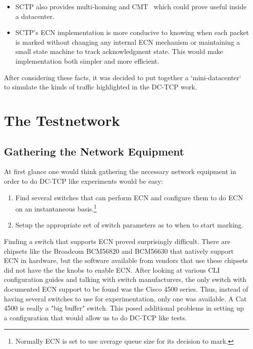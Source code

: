 \documentclass[12pt]{article}
\begin{document}
\begin{enumerate}
\begin{itemize}
\item SCTP also provides multi-homing and CMT~\cite{jana} which could prove useful inside a datacenter.

\item SCTP's ECN implementation is more conducive to knowing when each packet is marked without
      changing any internal ECN mechanism or maintaining a small state machine to track acknowledgment state. 
      This would make implementation both simpler and more efficient.
\end{itemize}

\end{enumerate}

After considering these facts, it was decided to put together a `mini-datacenter`
to simulate the kinds of traffic highlighted in the DC-TCP work.

\section{The Testnetwork}
\subsection{Gathering the Network Equipment}

At first glance one would think gathering the necessary network equipment in order to do DC-TCP like
experiments would be easy:
\begin{enumerate}
\item Find several switches that can perform ECN and configure them
to do ECN on an instantaneous basis.\footnote{Normally ECN is set to use average queue size
for its decision to mark.}

\item Setup the appropriate set of switch parameters as to when to start
marking. 

\end{enumerate}

Finding a switch that supports ECN proved surprisingly difficult.  
There are chipsets like the Broadcom BCM56820 and BCM56630 that natively support 
ECN in hardware,  but the software available from vendors that use
these chipsets did not have the the knobs to enable ECN. After looking at various CLI
configuration guides and talking with switch manufacturers, the only switch with documented
ECN support to be found was the Cisco 4500 series. Thus, instead of having several switches
to use for experimentation, only one was available. A Cat 4500 is really a "big buffer"
switch. This posed additional problems in setting up a configuration
that would allow us to do DC-TCP like tests.
\end{document}
